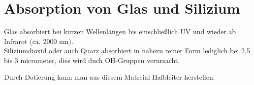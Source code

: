 
\section{Absorption von Glas und Silizium}
\label{sec:absorption}

Glas absorbiert bei kurzen Wellenlängen bis einschließlich UV und wieder ab Infrarot (ca. 2000 nm).\\

Siliziumdioxid oder auch Quarz absorbiert in nahezu reiner Form lediglich bei 2,5 bis 3 micrometer, dies wird duch OH-Gruppen verursacht.

Durch Dotierung kann man aus diesem Matreial Halbleiter herstellen.

